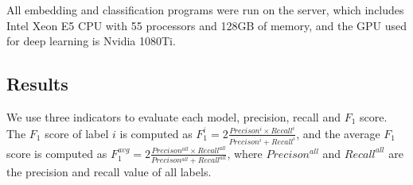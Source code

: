 
All embedding and classification programs were run on the server, which includes Intel Xeon E5 CPU with 55 processors and 128GB of memory, and the GPU used for deep learning is Nvidia 1080Ti.

\subsection{Results}
We use three indicators to evaluate each model, precision, recall and $F_1$ score. The $F_1$ score of label $i$ is computed as $F_1^i=2\frac{Precison^i \times Recall^i}{Precison^i + Recall^i}$, and the average $F_1$ score is computed as $F_1^{avg}=2\frac{Precison^{all} \times Recall^{all}}{Precison^{all} + Recall^{all}}$, where $Precison^{all}$ and $Recall^{all}$ are the precision and recall value of all labels.


